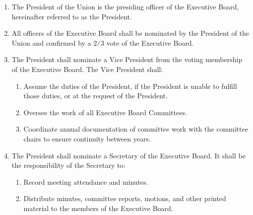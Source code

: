 
\begin{enumerate}
\item The President of the Union is the presiding officer of the Executive Board, hereinafter referred to as the President. 
\item All officers of the Executive Board shall be nominated by the President of the Union and confirmed by a 2⁄3 vote of the Executive Board.
\item The President shall nominate a Vice President from the voting membership of the Executive Board. The Vice President shall: 
\begin{enumerate}
\item Assume the duties of the President, if the President is unable to fulfill those duties, or at the request of the President. 
\item Oversee the work of all Executive Board Committees.
\item Coordinate annual documentation of committee work with the committee chairs to ensure continuity between years.
\end{enumerate}
\item The President shall nominate a Secretary of the Executive Board. It shall be the responsibility of the Secretary to:
\begin{enumerate}
\item Record meeting attendance and minutes.
\item Distribute minutes, committee reports, motions, and other printed material to the members of the Executive Board.
\end{enumerate}
\end{enumerate}